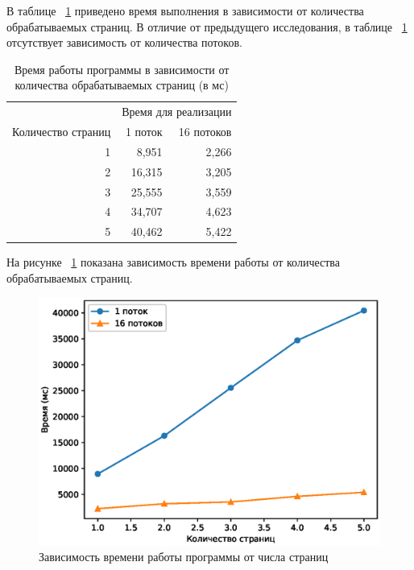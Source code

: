 В таблице ~\ref{tbl:time_measurements2} приведено время выполнения в зависимости
от количества обрабатываемых страниц. В отличие от предыдущего исследования,
в таблице ~\ref{tbl:time_measurements2} отсутствует зависимость от количества
потоков.

\clearpage

\begin{table}[h]
	\begin{center}
		\begin{threeparttable}
		\captionsetup{justification=raggedright,singlelinecheck=off}
		\caption{Время работы программы в зависимости от количества обрабатываемых страниц (в мс)}
		\label{tbl:time_measurements2}
                \begin{tabular}{|r|r|r|}
			\hline 
			& \multicolumn{2}{c|}{Время для реализации} \\
                        \cline{2-3}
			Количество страниц & 1 поток & 16 потоков\\
			\hline
                        1 & 8,951 & 2,266 \\
                         \hline
                        2 & 16,315 & 3,205 \\
                         \hline
                        3 & 25,555 & 3,559 \\
                         \hline
                        4 & 34,707 & 4,623 \\
                         \hline
                        5 & 40,462 & 5,422 \\
                         \hline
		\end{tabular}
		\end{threeparttable}
    \end{center}
\end{table}

На рисунке ~\ref{fig:image2} показана зависимость времени работы от количества
обрабатываемых страниц.

\begin{figure}[h!]
    \centering
    \includegraphics[]{img/Figure_2.eps}
    \caption{Зависимость времени работы программы от числа страниц}
    \label{fig:image2}
\end{figure}



